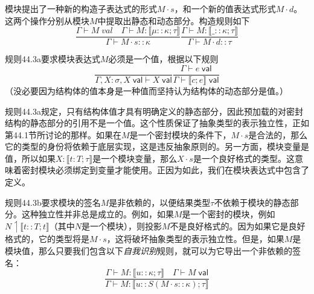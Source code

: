 模块提出了一种新的构造子表达式的形式$M \cdot s$，和一个新的值表达式形式$M\cdot d$。这两个操作分别从模块$M$中提取出静态和动态部分。构造规则如下
\begin{subequations}
\begin{equation}\label{44_3_a}
\frac{\Gamma \vdash M \; val \quad \Gamma \vdash M : \llbracket \mu::\kappa;\tau\rrbracket }{\Gamma \vdash M \cdot s::\kappa}
\end{equation}

\begin{equation}\label{44_3_b}
\frac{\Gamma \vdash M:\llbracket \_::\kappa;\tau\rrbracket }{\Gamma \vdash M \cdot d::\tau}
\end{equation}
\end{subequations}

规则44.3a要求模块表达式$M$必须是一个值，根据以下规则
\begin{subequations}
\begin{equation}\label{44_4_a}
\frac{}{\Gamma,X:\sigma,X\;\mathsf{val}\vdash X\;\mathsf{val}}
\end{equation}

\begin{equation}\label{44_4_b}
\frac{\Gamma \vdash e \; \mathsf{val}}{\Gamma \vdash \llbracket c;e\rrbracket \;\mathsf{val}}
\end{equation}
\end{subequations}
（没必要因为结构体的值本身是一种值而坚持认为结构体的动态部分是值。）

规则44.3a规定，只有结构体值才具有明确定义的静态部分，因此预加载的对密封结构的静态部分的引用不是一个值。这个性质保证了抽象类型的表示独立性，正如第44.1节所讨论的那样。如果在$M$是一个密封模块的条件下，$M\cdot s$是合法的，那么它的类型的身份将依赖于底层实现，这是违反抽象原则的。另一方面，模块变量是值，所以如果$X:\llbracket t:T;\tau\rrbracket $是一个模块变量，那么$X\cdot s$是一个良好格式的类型。这意味着密封模块必须绑定到变量才能使用。正因为如此，我们在模块表达式中包含了定义。

规则44.3b要求模块的签名$M$是非依赖的，以便结果类型$\tau$不依赖于模块的静态部分。这种独立性并非总是成立的。例如，如果$M$是一个密封的模块，例如$N\upharpoonleft \llbracket t :: T;t\rrbracket $（其中$N$是一个模块），则投影$M$不是良好格式的。因为如果它是良好格式的，它的类型将是$M\cdot s$，这将破坏抽象类型的表示独立性。但是，如果$M$是模块值，那么只要我们包含以下\textit{自我识别}规则，就可以为它导出一个非依赖的签名：
\begin{equation}\label{44_5}
\frac{\Gamma \vdash M:\llbracket u::\kappa;\tau\rrbracket \quad\Gamma\vdash M\;\mathsf{val}}{\Gamma\vdash M:\llbracket u::S(M\cdot s::\kappa);\tau\rrbracket }
\end{equation}

